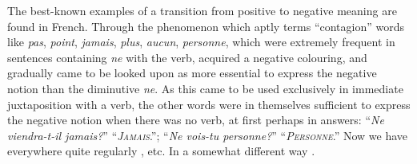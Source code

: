 \label{ch:3}

The best-known examples of a transition from positive to negative meaning are found in French. Through the phenomenon which \citet[\href{https://archive.org/details/in.ernet.dli.2015.261285/page/n265/mode/2up&view=theater}{200ff}]{breal1900semantics} aptly terms 
``contagion'' words like \textit{pas}, \textit{point}, \textit{jamais}, \textit{plus}, \textit{aucun}, \textit{personne}, which were extremely frequent in sentences containing \textit{ne} with the verb, acquired a negative colouring, and gradually came to be looked upon as more essential to express the negative notion than the diminutive \textit{ne}. As this came to be used exclusively in immediate juxtaposition with a verb, the other words were in themselves sufficient to express the negative notion when there was no verb, at first perhaps in answers: ``\textit{Ne viendra-t-il jamais?}'' ``\emph{\textit{\textsc{Jamais}}}.''; ``\textit{Ne vois-tu personne?}'' ``\emph{\textit{\textsc{Personne}}}.'' Now we have everywhere quite regularly , etc. In a somewhat different way .

